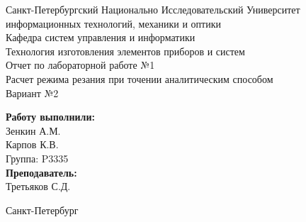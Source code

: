 \begin{titlepage}	%

	\begin{center}		%

		\large Санкт-Петербургский Национально Исследовательский Университет\\
		\large информационных технологий, механики и оптики \\
		\large Кафедра систем управления и информатики\\[6cm]
		
		\huge Технология изготовления элементов приборов и систем\\[0.5cm] %
		\large Отчет по лабораторной работе №1\\[0.1cm]
		\large Расчет режима резания при точении аналитическим способом\\[1cm]
		\large Вариант №2\\[5cm]

	\end{center}


	\begin{flushright} %
		\begin{minipage}{0.25\textwidth} %
			\begin{flushleft} %

				\large\textbf{Работу выполнили:}\\
				\large Зенкин А.М.\\
				\large Карпов К.В.\\
				\large {Группа:} P3335\\
				
				\large \textbf{Преподаватель:}\\
				\large Третьяков С.Д.

			\end{flushleft}
		\end{minipage}
	\end{flushright}
	
	\vfill %

	\begin{center}
	\large Санкт-Петербург\\
	\large \the\year %
	\end{center} %

\thispagestyle{empty} %
\end{titlepage} %

\vfill %
